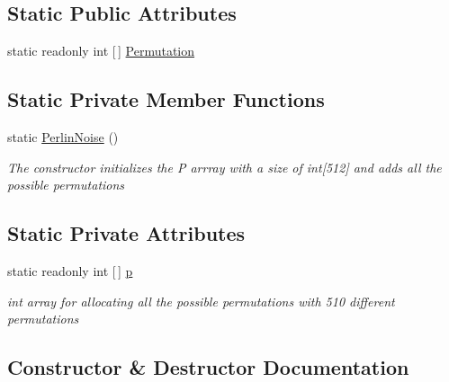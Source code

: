 \subsection*{Static Public Attributes}
\begin{DoxyCompactItemize}
\item 
static readonly int \mbox{[}$\,$\mbox{]} \mbox{\hyperlink{class_assets_1_1_scripts_1_1_perlin_noise_a46a02100e36b5623fe5ec906851293b6}{Permutation}}
\end{DoxyCompactItemize}
\subsection*{Static Private Member Functions}
\begin{DoxyCompactItemize}
\item 
static \mbox{\hyperlink{class_assets_1_1_scripts_1_1_perlin_noise_a1cfd50708d9b3a806478e9abe6c6d5e0}{Perlin\+Noise}} ()
\begin{DoxyCompactList}\small\item\em The constructor initializes the P arrray with a size of int\mbox{[}512\mbox{]} and adds all the possible permutations \end{DoxyCompactList}\end{DoxyCompactItemize}
\subsection*{Static Private Attributes}
\begin{DoxyCompactItemize}
\item 
static readonly int \mbox{[}$\,$\mbox{]} \mbox{\hyperlink{class_assets_1_1_scripts_1_1_perlin_noise_accf12ab1d7995b1bbeae5301d55f61b3}{p}}
\begin{DoxyCompactList}\small\item\em int array for allocating all the possible permutations with 510 different permutations \end{DoxyCompactList}\end{DoxyCompactItemize}


\subsection{Constructor \& Destructor Documentation}
\mbox{\label{class_assets_1_1_scripts_1_1_perlin_noise_a1cfd50708d9b3a806478e9abe6c6d5e0}} 
